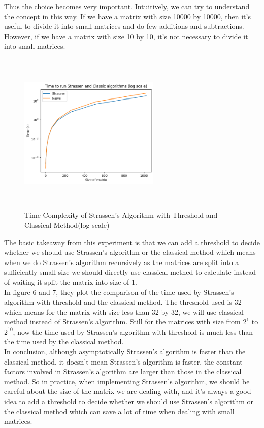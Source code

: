 \documentclass{article}
\begin{document}
Thus the choice becomes very important. Intuitively, we can try to understand the concept in this way. If we have a matrix with size 10000 by 10000, then it's 
useful to divide it into small matrices and do few additions and subtractions. However, if we have a matrix with size 10 by 10, it's not necessary to divide it into small matrices.\\
\begin{figure}[h!]
    \centering
    \includegraphics[width=0.6\textwidth, height=7.8cm]{figs/log_time_4.png}
    \caption{Time Complexity of Strassen's Algorithm with Threshold and Classical Method(log scale)}
\end{figure}

The basic takeaway from this experiment
is that we can add a threshold to decide whether we should use Strassen's algorithm or the classical method which means when we do Strassen's algorithm recursively as the matrices are split into a sufficiently small size we 
should directly use classical methed to calculate instead of waiting it split the matrix into size of 1.\\

In figure 6 and 7, they plot the comparison of the time used by Strassen's algorithm with threshold and the classical method. The threshold used is 32 which means for the matrix with size less than 32 by 32, we will use 
classical method instead of Strassen's algorithm. Still for the matrices with size from $2^1$ to $2^{10}$, now the time used by Strassen's algorithm with threshold is much less than the time used by the classical method.\\

In conclusion, although asymptotically Strassen's algorithm is faster than the classical method, it doesn't mean Strassen's algorithm is faster, the constant factors involved in Strassen's algorithm are larger than those 
in the classical method. So in practice, when implementing Strassen's algorithm, we should be careful about the size of the matrix we are dealing with, and it's always a good idea to add a threshold to decide whether we 
should use Strassen's algorithm or the classical method which can save a lot of time when dealing with small matrices.
\end{document}
